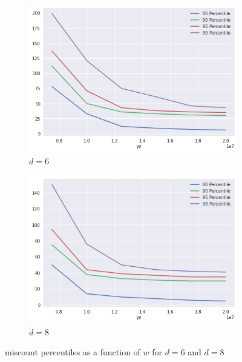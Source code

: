 \begin{figure}[htb]
    \centering
    \begin{subfigure}{.5\textwidth}
        \centering
        \includegraphics[width=\textwidth]{figures/e_coli-dbcm-error_percentiles-K31-D6}
        \caption{$d = 6$}\label{fig:ecoli-art-dbcm-errors-d6}
    \end{subfigure}%
    \begin{subfigure}{.5\textwidth}
        \centering
        \includegraphics[width=\textwidth]{figures/e_coli-dbcm-error_percentiles-K31-D8}
        \caption{$d = 8$}\label{fig:ecoli-art-dbcm-errors-d8}
    \end{subfigure}
	\caption{\dBCM miscount percentiles as a function of $w$ for $d = 6$ and $d = 8$}\label{fig:ecoli-art-dbcm-errors}
\end{figure}

